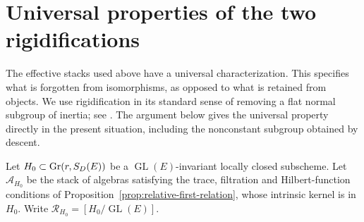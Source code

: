 \documentclass[11pt,reqno]{amsart}
\numberwithin{equation}{section}
\theoremstyle{definition}\newtheorem{definition}[theorem]{Definition}
\theoremstyle{remark}\newtheorem{remark}[theorem]{Remark}
\begin{document}
\section{Universal properties of the two rigidifications}
\label{sec:rigidification-v151}

The effective stacks used above have a universal characterization.
This specifies what is forgotten from isomorphisms, as opposed to what
is retained from objects.  We use rigidification in its standard sense
of removing a flat normal subgroup of inertia; see
\cite[Tag~04V2]{StacksRigidV151}.  The argument below gives the
universal property directly in the present situation, including the
nonconstant subgroup obtained by descent.

Let \(H_0\subset\operatorname{Gr}(r,S_D(E))\) be a
\(\operatorname{GL}(E)\)-invariant locally closed subscheme.  Let
\(\mathscr A_{H_0}\) be the stack of algebras satisfying the trace,
filtration and Hilbert-function conditions of
Proposition~\ref{prop:relative-first-relation}, whose intrinsic
kernel is in \(H_0\).  Write
\(\mathscr R_{H_0}=[H_0/\operatorname{GL}(E)]\).
\end{document}
